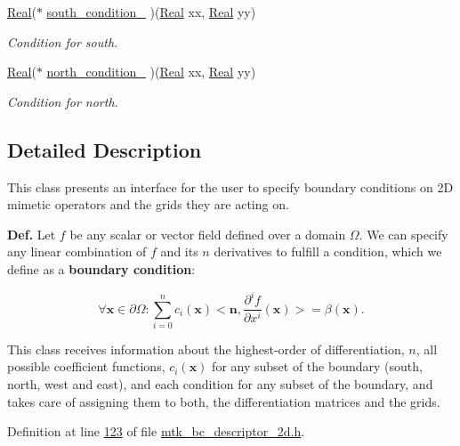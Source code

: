 \begin{DoxyCompactItemize}
\hyperlink{group__c01-roots_gac080bbbf5cbb5502c9f00405f894857d}{Real}($\ast$ \hyperlink{classmtk_1_1BCDescriptor2D_a2a933b473abbe47ad7c79ef7939e7768}{south\+\_\+condition\+\_\+} )(\hyperlink{group__c01-roots_gac080bbbf5cbb5502c9f00405f894857d}{Real} xx, \hyperlink{group__c01-roots_gac080bbbf5cbb5502c9f00405f894857d}{Real} yy)
\begin{DoxyCompactList}\small\item\em Condition for south. \end{DoxyCompactList}\item 
\hyperlink{group__c01-roots_gac080bbbf5cbb5502c9f00405f894857d}{Real}($\ast$ \hyperlink{classmtk_1_1BCDescriptor2D_a23e0b9ae755dcf81841aa24ddaf0b090}{north\+\_\+condition\+\_\+} )(\hyperlink{group__c01-roots_gac080bbbf5cbb5502c9f00405f894857d}{Real} xx, \hyperlink{group__c01-roots_gac080bbbf5cbb5502c9f00405f894857d}{Real} yy)
\begin{DoxyCompactList}\small\item\em Condition for north. \end{DoxyCompactList}\end{DoxyCompactItemize}


\subsection{Detailed Description}
This class presents an interface for the user to specify boundary conditions on 2\+D mimetic operators and the grids they are acting on.

{\bfseries Def.} Let $ f $ be any scalar or vector field defined over a domain $ \Omega $. We can specify any linear combination of $ f $ and its $ n $ derivatives to fulfill a condition, which we define as a {\bfseries boundary condition}\+:

\[ \forall \mathbf{x} \in \partial\Omega: \sum_{i = 0}^{n} c_i(\mathbf{x}) <\mathbf{n}, \frac{\partial^i f}{\partial x^i}(\mathbf{x})> = \beta(\mathbf{x}). \]

This class receives information about the highest-\/order of differentiation, $ n $, all possible coefficient functions, $ c_i(\mathbf{x}) $ for any subset of the boundary (south, north, west and east), and each condition for any subset of the boundary, and takes care of assigning them to both, the differentiation matrices and the grids. 

Definition at line \hyperlink{mtk__bc__descriptor__2d_8h_source_l00123}{123} of file \hyperlink{mtk__bc__descriptor__2d_8h_source}{mtk\+\_\+bc\+\_\+descriptor\+\_\+2d.\+h}.



